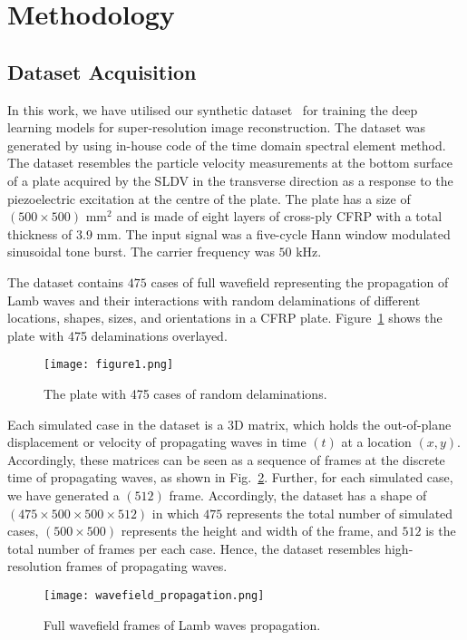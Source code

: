 \section{Methodology}
\subsection{Dataset Acquisition}
In this work, we have utilised our synthetic dataset~\cite{kudela_pawel_2021_5414555} for training the deep learning models for super-resolution image reconstruction.
The dataset was generated by using in-house code of the time domain spectral element method.
The dataset resembles the particle velocity measurements at the bottom surface of a plate acquired by the SLDV in the transverse direction as a response to the piezoelectric excitation at the centre of the plate.
The plate has a size of \( (500\times500)\) mm\(^2\) and is made of eight layers of cross-ply CFRP with a total thickness of \(3.9\) mm.
The input signal was a five-cycle Hann window modulated sinusoidal tone burst. The carrier frequency was \(50\) kHz.

The dataset contains \(475\) cases of full wavefield representing the propagation of Lamb waves and their interactions with random delaminations of different locations, shapes, sizes, and orientations in a CFRP plate.
Figure~\ref{fig:All_cases} shows the plate with 475 delaminations overlayed.
\begin{figure} [!ht]
	\begin{center}
		\texttt{[image: figure1.png]}
	\end{center}
	\caption{The plate with 475 cases of random delaminations.} 
	\label{fig:All_cases}
\end{figure}

Each simulated case in the dataset is a 3D matrix, which holds the out-of-plane displacement or velocity of propagating waves in time \((t)\) at a location \((x,y)\). 
Accordingly, these matrices can be seen as a sequence of frames at the discrete time of propagating waves, as shown in Fig.~\ref{fig:wavefield_propagation}. 
Further, for each simulated case, we have generated a \((512)\) frame.
Accordingly, the dataset has a shape of \((475\times500\times500\times512)\) in which \(475\) represents the total number of simulated cases, \((500\times500)\) represents the height and width of the frame, and \(512\) is the total number of frames per each case.
Hence, the dataset resembles high-resolution frames of propagating waves.
\begin{figure}[!ht]
	\begin{center}
		\texttt{[image: wavefield\_propagation.png]}
	\end{center}
	\caption{Full wavefield frames of Lamb waves propagation.} 
	\label{fig:wavefield_propagation}
\end{figure}

